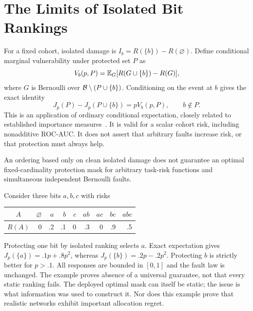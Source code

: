 \section{The Limits of Isolated Bit Rankings}
\label{sec:limits}
For a fixed cohort, isolated damage is $I_b=R(\{b\})-R(\varnothing)$. Define
conditional marginal vulnerability under protected set $P$ as
\begin{equation}
V_b(p,P)=\mathbb{E}_G[R(G\cup\{b\})-R(G)],
\label{eq:conditional}
\end{equation}
where $G$ is Bernoulli over $\mathcal{B}\setminus(P\cup\{b\})$. Conditioning on the
event at $b$ gives the exact identity
\begin{equation}
J_p(P)-J_p(P\cup\{b\})=pV_b(p,P),\qquad b\notin P.
\label{eq:benefit}
\end{equation}
This is an application of ordinary conditional expectation, closely related to
established importance measures~\cite{odonnell2014analysis,rauzy2022reliability}.
It is valid for a scalar cohort risk, including nonadditive ROC-AUC. It does not
assert that arbitrary faults increase risk, or that protection must always help.

\begin{proposition}
An ordering based only on clean isolated damage does not guarantee an optimal
fixed-cardinality protection mask for arbitrary task-risk functions and
simultaneous independent Bernoulli faults.
\end{proposition}
Consider three bits $a,b,c$ with risks
\begin{center}
\begin{tabular}{c|rrrrrrrr}
$A$ & $\varnothing$ & $a$ & $b$ & $c$ & $ab$ & $ac$ & $bc$ & $abc$\\
\hline
$R(A)$ & 0 & .2 & .1 & 0 & .3 & 0 & .9 & .5
\end{tabular}
\end{center}
Protecting one bit by isolated ranking selects $a$. Exact expectation gives
$J_p(\{a\})=.1p+.8p^2$, whereas $J_p(\{b\})=.2p-.2p^2$. Protecting $b$ is
strictly better for $p>.1$. All responses are bounded in $[0,1]$ and the fault
law is unchanged. The example proves absence of a universal guarantee, not that
every static ranking fails. The deployed optimal mask can itself be static;
the issue is what information was used to construct it. Nor does this example
prove that realistic networks exhibit important allocation regret.

